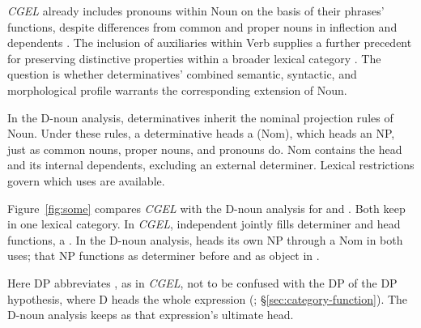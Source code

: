 \documentclass[12pt]{article}
\begin{document}
\textit{CGEL} already includes pronouns within Noun on the basis of their phrases' functions, despite differences from common and proper nouns in inflection and dependents \citep[327--328]{huddleston2002}. The inclusion of auxiliaries within Verb supplies a further precedent for preserving distinctive properties within a broader lexical category \citep{pullumwilson1977}. The question is whether determinatives' combined semantic, syntactic, and morphological profile warrants the corresponding extension of Noun.

In the D-noun analysis, determinatives inherit the nominal projection rules of Noun. Under these rules, a determinative heads a  (Nom), which heads an NP, just as common nouns, proper nouns, and pronouns do. Nom contains the head and its internal dependents, excluding an external determiner. Lexical restrictions govern which uses are available.

Figure~\ref{fig:some} compares \textit{CGEL} with the D-noun analysis for  and . Both keep  in one lexical category. In \textit{CGEL}, independent  jointly fills determiner and head functions, a  \citep[410--412]{huddleston2002}. In the D-noun analysis,  heads its own NP through a Nom in both uses; that NP functions as determiner before  and as object in .

Here DP abbreviates , as in \textit{CGEL}, not to be confused with the DP of the DP hypothesis, where D heads the whole expression  (\citealp{abney1987}; §\ref{sec:category-function}). The D-noun analysis keeps  as that expression's ultimate head.
\end{document}
